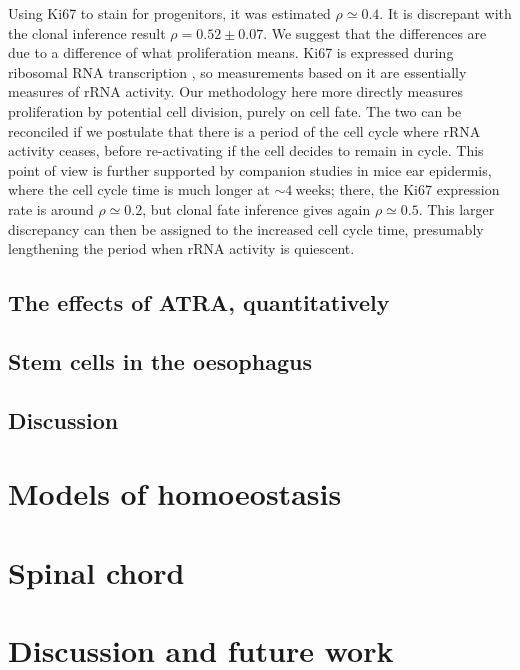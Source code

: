 \documentclass[10pt,english]{report}
\begin{document}
Using Ki67 to stain for progenitors, it was estimated $\rho \simeq 0.4$. It is discrepant with the clonal inference result $\rho = 0.52 \pm 0.07$. We suggest that the differences are due to a difference of what proliferation means. Ki67 is expressed during ribosomal RNA transcription \citep{ki67rRNA}, so measurements based on it are essentially measures of rRNA activity. Our methodology here more directly measures proliferation by potential cell division, purely on cell fate. The two can be reconciled if we postulate that there is a period of the cell cycle where rRNA activity ceases, before re-activating if the cell decides to remain in cycle. This point of view is further supported by companion studies in mice ear epidermis, where the cell cycle time is much longer at $\sim 4~\textrm{weeks}$; there, the Ki67 expression rate is around $\rho \simeq 0.2$, but clonal fate inference gives again $\rho \simeq 0.5$. This larger discrepancy can then be assigned to the increased cell cycle time, presumably lengthening the period when rRNA activity is quiescent.

\section{\label{sec:atra}The effects of ATRA, quantitatively}



\section{\label{sec:oesophagus-stem}Stem cells in the oesophagus}

\section{Discussion}

\chapter{Models of homoeostasis}

\chapter{Spinal chord}

\chapter{Discussion and future work}


\newpage
{}
\renewcommand\bibname{References}


\end{document}
